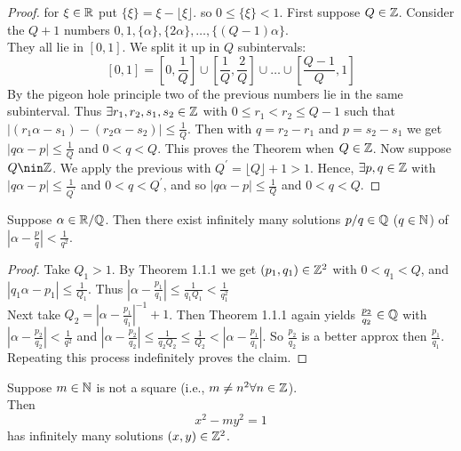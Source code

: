 \documentclass[NumTh.tex]{subfiles}
\begin{document}
\begin{proof}
  for $\xi \in \mathbb{R}$ put $\{ \xi \} = \xi - \lfloor \xi \rfloor$. so $ 0 \leq \{ \xi\} < 1$. First suppose $Q \in \mathbb{Z}$.
  Consider the $Q + 1$ numbers $0,1,\{\alpha\},\{2\alpha\},\dots,\{(Q-1)\alpha\}$.\\
  They all lie in $[0,1]$. We split it up in $Q$ subintervals:
  \[ [0,1] =[0, \frac{1}{Q}] \cup \left[ \frac{1}{Q},\frac{2}{Q} \right] \cup \dots \cup \left[ \frac{Q-1}{Q},1 \right] \]
  By the pigeon hole principle two of the previous numbers lie in the same subinterval. Thus $\exists r_1,r_2,s_1,s_2 \in \mathbb{Z}$ with $0 \leq r_1 < r_2 \leq Q-1$ such that $| (r_1\alpha - s_1) - (r_2 \alpha -s_2) | \leq \frac{1}{Q}$.
  Then with $q = r_2 - r_1$ and $p = s_2 -s_1$ we get $|q\alpha - p| \leq \frac{1}{Q}$ and $0 < q < Q$.
  This proves the Theorem when $Q \in \mathbb{Z}$. Now suppose $Q \nin \Z$. 
  We apply the previous with $Q^\prime = \lfloor Q \rfloor + 1 > 1$.
  Hence, $\exists p,q \in \mathbb{Z}$ with $| q\alpha - p | \leq \frac{1}{Q^\prime}$ and $0 < q < Q^\prime$, and so $|q\alpha - p | \leq \frac{1}{Q}$ and $0 < q < Q$.
\end{proof}

\begin{cor}\label{1_1_2}
  Suppose $\alpha \in \mathbb{R}/\mathbb{Q}$. Then there exist infinitely many solutions $p/q \in \mathbb{Q}$ ($q \in \mathbb{N}$) of $| \alpha - \frac{p}{q}| < \frac{1}{q^2}$.
\end{cor}

\begin{proof}
  Take $Q_1 > 1$. By Theorem 1.1.1 we get $(p_1, q_1) \in \mathbb{Z}^2$ with $0<q_1 < Q$, and $|q_1 \alpha - p_1 | \leq \frac{1}{Q_1}$.
  Thus $|\alpha - \frac{p_1}{q_1} | \leq \frac{1}{q_1 Q_1} < \frac{1}{q_1^2}$
  \\
  Next take $Q_2 = |\alpha - \frac{p_1}{q_1}|^{-1} + 1$. Then Theorem 1.1.1 again yields $\frac{p_2}{q_2} \in \mathbb{Q}$ with $|\alpha - \frac{p_2}{q_2} | < \frac{1}{q^2}$ and $|\alpha - \frac{p_2}{q_2} | \leq \frac{1}{q_2 Q_2} \leq \frac{1}{Q_2} < |\alpha - \frac{p_1}{q_1}|$. So $\frac{p_2}{q_2}$ is a better approx then $\frac{p_1}{q_1}$.
  Repeating this process indefinitely proves the claim.
\end{proof}

\begin{theorem}\label{1_1_3}
  Suppose $m \in \mathbb{N}$ is not a square (i.e., $m \neq n^2 \forall n \in \mathbb{Z}$).\\
  Then 
  \[x^2 - m y^2 = 1\]
  has infinitely many solutions $(x,y)\in \mathbb{Z}^2$.
\end{theorem}
\end{document}
